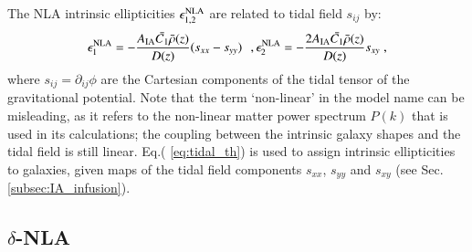\documentclass[useAMS,usenatbib]{mn2e}
\begin{document}
The NLA intrinsic ellipticities $\epsilon_{1,2}^{\rm NLA}$ are related to tidal field $s_{ij}$ by:
 \begin{eqnarray}
\epsilon_1^{\rm NLA} = - \frac{A_{\rm IA}\bar{C_1}\bar{\rho}(z)}{D(z)} (s_{xx} - s_{yy}) \,\,\,\,,   \epsilon_2^{\rm NLA} = - \frac{2 A_{\rm IA}\bar{C_1}\bar{\rho}(z)}{D(z)} s_{xy}\;,
\label{eq:tidal_th}
\end{eqnarray}
where $s_{ij} = \partial_{ij}\phi$ are the Cartesian components of the tidal tensor of the gravitational potential. Note that the term `non-linear' in the model name can be  misleading, as it refers to the non-linear matter power spectrum $P(k)$ that is used in its calculations; the coupling between the intrinsic galaxy shapes and the tidal field is still linear.   Eq.( \ref{eq:tidal_th}) is used to assign intrinsic ellipticities to galaxies, given maps of the tidal field components $s_{xx}$, $s_{yy}$ and $s_{xy}$ (see Sec. \ref {subsec:IA_infusion}).

\subsection{$\delta$-NLA}
\label{subsec:IA_th_ext}



\end{document}
